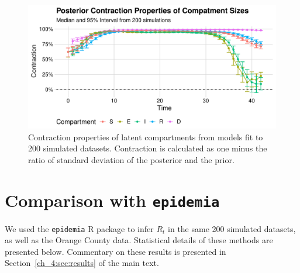 \begin{figure}[htbp]
    \centering
    \includegraphics[width=1.0\columnwidth]{generated_quantities_simulation_compartment_shrinkage_plot}
    \caption{Contraction properties of latent compartments from models fit to 200 simulated datasets.
    Contraction is calculated as one minus the ratio of standard deviation of the posterior and the prior.}
    \label{ch_4:fig:generated_quantities_simulation_compartment_shrinkage_plot}
\end{figure}

\section{Comparison with \texttt{epidemia}}
\label{ch_4:epidemia_section}

We used the \texttt{epidemia} R package to infer \( R_t \) in the same 200 simulated datasets, as well as the Orange County data. 
Statistical details of these methods are presented below.
Commentary on these results is presented in Section~\ref{ch_4:sec:results} of the main text.

